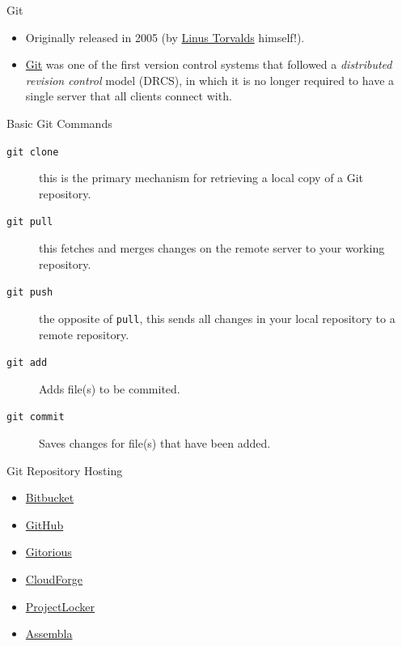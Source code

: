 \documentclass[aspectratio=169]{beamer}
\begin{document}
\begin{frame}{Git}

\begin{itemize}
\item Originally released in 2005 (by
\href{https://en.wikipedia.org/wiki/Linus_Torvalds}{Linus Torvalds}
himself!).
\item \href{https://en.wikipedia.org/wiki/Git_(software)}{Git} was
one of the first version control systems that followed a
\emph{distributed revision control} model (DRCS), in which it is no
longer required to have a single server that all clients connect with.
\end{itemize}

\end{frame}

\begin{frame}{Basic Git Commands}

\begin{description}
\item[\texttt{git clone}] this is the primary mechanism for retrieving
  a local copy of a Git repository.
\item[\texttt{git pull}] this fetches and merges changes on the remote
  server to your working repository.
\item[\texttt{git push}] the opposite of \texttt{pull}, this sends all
  changes in your local repository to a remote repository.
\item[\texttt{git add}] Adds file(s) to be commited.
\item[\texttt{git commit}] Saves changes for file(s) that have been added.
\end{description}

\end{frame}

\begin{frame}{Git Repository Hosting}

\begin{itemize}
\item
  \href{https://bitbucket.org/dashboard/overview}{Bitbucket}
\item
  \href{https://github.com/}{GitHub}
\item
  \href{https://gitorious.org/}{Gitorious}
\item
  \href{http://www.cloudforge.com/}{CloudForge}
\item
  \href{http://projectlocker.com/}{ProjectLocker}
\item
  \href{http://offers.assembla.com/free-git-hosting/}{Assembla}
\end{itemize}

\end{frame}
\end{document}
